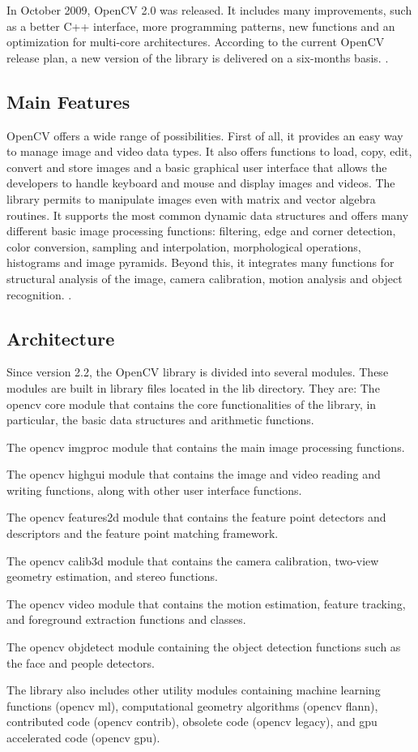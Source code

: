 	In October 2009, \mbox{OpenCV} 2.0 was released. It includes many improvements, such as a better C++ interface, more programming patterns, new functions and an optimization for multi-core architectures. According to the current \mbox{OpenCV} release plan, a new version of the library is delivered on a six-months basis. \cite{OpenCV:ChangeLogs}.
	
	\subsection{Main Features}
	\mbox{OpenCV} offers a wide range of possibilities. First of all, it provides an easy way to manage image and video data types. It also offers functions to load, copy, edit, convert and store images and a basic graphical user interface that allows the developers to handle keyboard and mouse and display images and videos. The library permits to manipulate images even with matrix and vector algebra routines. It supports the most common dynamic data structures and offers many different basic image processing functions: filtering, edge and corner detection, color conversion, sampling and interpolation, morphological operations, histograms and image pyramids. Beyond this, it integrates many functions for structural analysis of the image, camera calibration, motion analysis and object recognition. \cite{Agam2006}.
	
	\subsection{Architecture}
	Since version 2.2, the OpenCV library is divided into several modules. These modules are built in library files located in the lib directory. They are:
	 The opencv core module that contains the core functionalities of the library, in   particular, the basic data structures and arithmetic functions.

	The opencv imgproc module that contains the main image processing functions.

	The opencv highgui module that contains the image and video reading and   writing functions, along with other user interface functions.

	The opencv features2d module that contains the feature point detectors and   descriptors and the feature point matching framework.

	The opencv calib3d module that contains the camera calibration, two-view   geometry estimation, and stereo functions.

	The opencv video module that contains the motion estimation, feature tracking,   and foreground extraction functions and classes.

	 The opencv objdetect module containing the object detection functions such as   the face and people detectors.

	The library also includes other utility modules containing machine learning functions (opencv ml), computational geometry algorithms (opencv flann), contributed code (opencv contrib), obsolete code (opencv legacy), and gpu accelerated code (opencv gpu).


